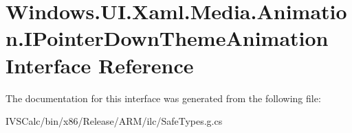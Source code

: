 \hypertarget{interface_windows_1_1_u_i_1_1_xaml_1_1_media_1_1_animation_1_1_i_pointer_down_theme_animation}{}\section{Windows.\+U\+I.\+Xaml.\+Media.\+Animation.\+I\+Pointer\+Down\+Theme\+Animation Interface Reference}
\label{interface_windows_1_1_u_i_1_1_xaml_1_1_media_1_1_animation_1_1_i_pointer_down_theme_animation}


The documentation for this interface was generated from the following file\+:\begin{DoxyCompactItemize}
\item 
I\+V\+S\+Calc/bin/x86/\+Release/\+A\+R\+M/ilc/Safe\+Types.\+g.\+cs\end{DoxyCompactItemize}
